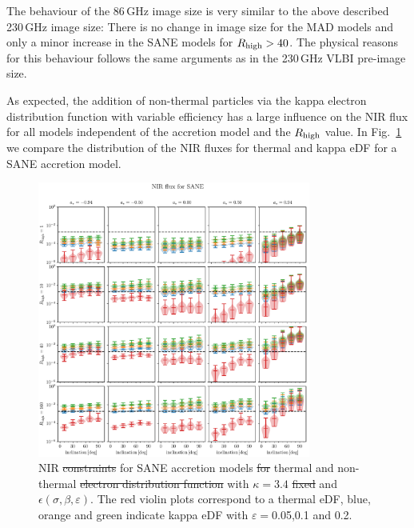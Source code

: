 The behaviour of the 86\,GHz image size is very similar to the above described 230\,GHz image size: There is no change in image size for the MAD models and only a minor increase in the SANE models for $R_\mathrm{high}>40$. The physical reasons for this behaviour follows the same arguments as in the 230\,GHz VLBI pre-image size.

As expected, the addition of non-thermal particles via the kappa electron distribution function with variable efficiency has a large influence on the NIR flux for all models independent of the accretion model and the $R_\mathrm{high}$ value. In Fig.~\ref{fig:NIR_kappaepsilon} we compare the distribution of the NIR fluxes for thermal and kappa eDF for a SANE accretion model.

\begin{figure}
  \centering
  \includegraphics[width=0.8\textwidth]{./figures/SANE_NIR_standard.pdf}
  \caption{ NIR \sout{constraints}   for SANE accretion models \sout{for} thermal and non-thermal \sout{electron distribution function} with $\kappa=3.4$ \sout{fixed} and $\epsilon\left(\sigma,\beta,\varepsilon\right)$. The red violin plots correspond to a thermal eDF, blue, orange and green indicate kappa eDF with $\varepsilon=$0.05,0.1 and 0.2.}
  \label{fig:NIR_kappaepsilon}
\end{figure}

